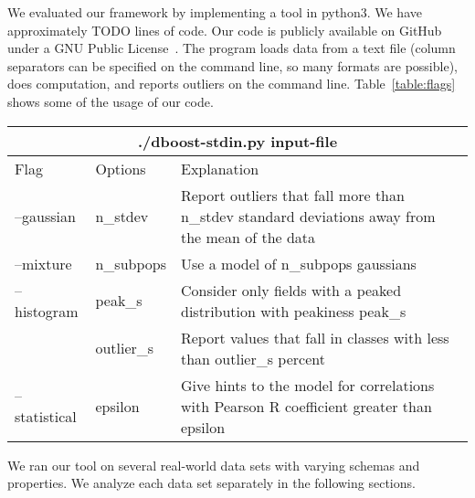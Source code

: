 
We evaluated our framework by implementing a tool in python3.
We have approximately TODO lines of code.
Our code is publicly available on GitHub under a GNU Public License~\cite{github}.
The program loads data from a text file (column separators can be specified on the command line, so many formats are possible), does computation, and reports outliers on the command line.
Table~\ref{table:flags} shows some of the usage of our code.

\begin{table*}
\label{table:flags}
\caption{Tool usage.}
\centering
\begin{tabular} {| l | l | p{10cm} |}
\hline
\multicolumn{3}{|c|}{./dboost-stdin.py input-file} \\
\hline
Flag & Options & Explanation \\
\hline
--gaussian & n\_stdev & Report outliers that fall more than n\_stdev standard deviations away from the mean of the data \\
--mixture & n\_subpops & Use a model of n\_subpops gaussians \\
--histogram & peak\_s & Consider only fields with a peaked distribution with peakiness peak\_s \\
  & outlier\_s & Report values that fall in classes with less than outlier\_s percent \\
--statistical & epsilon & Give hints to the model for correlations with Pearson R coefficient greater than epsilon \\
\hline
\end{tabular}
\end{table*}

We ran our tool on several real-world data sets with varying schemas and properties.
We analyze each data set separately in the following sections.
